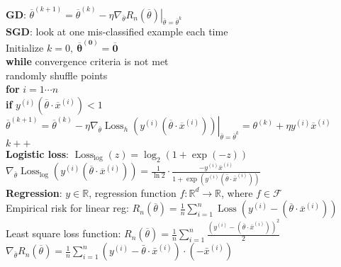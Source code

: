 \documentclass[10pt, letterpaper]{article}
\begin{document}
\begin{multicols*}{2}
\textbf{GD}: $\overline{\theta}^{(k+1)}=\overline{\theta}^{(k)}-\eta \nabla_{\overline{\theta}} R_{n}\left.(\overline{\theta})\right|_{\overline{\theta}=\overline{\theta}^{k}}$\\
\textbf{SGD}: look at one mis-classified example each time\\
Initialize $k=0, ~\overline{\boldsymbol{\theta}}^{(\mathbf{0})}=\overline{\boldsymbol{0}}$\\
\textbf{while} convergence criteria is not met\\
\hspace*{2ex} randomly shuffle points\\
\hspace*{2ex} \textbf{for} $i=1\cdots n$\\
\hspace*{4ex} \textbf{if} $y^{(i)}\left(\overline{\theta} \cdot \overline{x}^{(i)}\right)<1$\\
\hspace*{6ex}  $\overline{\theta}^{(k+1)}=\overline{\theta}^{(k)}-\eta \nabla_{\overline{\theta}} \operatorname{Loss}_{h}\left.\left(y^{(i)}\left(\overline{\theta} \cdot \overline{x}^{(i)}\right)\right)\right|_{\overline{\theta}=\overline{\theta}^{k}}=\theta^{(k)}+\eta y^{(i)} \overline{x}^{(i)}$\\
\hspace*{6ex} $k++$\\
\textbf{Logistic loss}: $\operatorname{Loss}_{\log }(z)=\log _{2}(1+\exp (-z))$\\
$\nabla_{\overline{\theta}} \operatorname{Loss}_{\text{log}}\left(y^{(i)}\left(\overline{\theta} \cdot \overline{x}^{(i)}\right)\right) = \frac 1 {\ln 2} \cdot \frac{-y^{(i)}\bar x^{(i)}}{1+\exp(y^{(i)}(\bar\theta \cdot \bar x ^{(i)}))}$\\
\textbf{Regression}: $y \in \mathbb{R}$, regression function $f : \mathbb{R}^{d} \rightarrow \mathbb{R} $, where $ f \in \mathcal{F}$\\
Empirical risk for linear reg: $R_{n}(\overline{\theta})=\frac{1}{n} \sum_{i=1}^{n} \operatorname{Loss}\left(y^{(i)}-\left(\overline{\theta} \cdot \overline{x}^{(i)}\right)\right)$\\
Least square loss function: $R_{n}(\overline{\theta})=\frac{1}{n} \sum_{i=1}^{n} \frac{\left(y^{(i)}-\left(\overline{\theta} \cdot \overline{x}^{(i)}\right)\right)^{2}}{2}$\\
$\nabla_{\overline{\theta}} R_{n}(\overline{\theta})= \frac 1 n\sum_{i=1}^n(y^{(i)} - \bar\theta \cdot \bar x ^{(i)})\cdot(-\bar x^{(i)})$\\

\end{multicols*}
\end{document}
